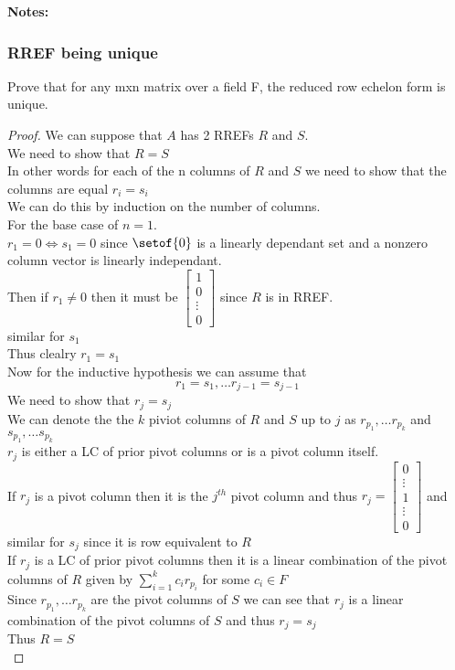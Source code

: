 \documentclass[answers,12pt,addpoints]{exam}
\begin{document}
\textbf{Notes:}\\

\subsubsection{RREF being unique}
Prove that for any mxn matrix over a field F, the reduced row echelon form is unique.\\
\begin{proof}
    We can suppose that $A$ has 2 RREFs $R$ and $S$.\\
    We need to show that $R = S$\\
    In other words for each of the n columns of $R$ and $S$ we need to show that the columns are equal $r_i = s_i$\\
    We can do this by induction on the number of columns.\\
    For the base case of $n=1$. \\
    $r_1 = 0 \iff s_1 = 0$ since $\setof{0}$ is a linearly dependant set and a nonzero column vector is linearly independant.\\
    Then if $r_1 \neq 0$ then it must be $\begin{bmatrix}
        1\\0\\ \vdots \\ 0
    \end{bmatrix}$ since $R$ is in RREF.\\
    similar for $s_1$\\
    Thus clealry $r_1 = s_1$\\
    Now for the inductive hypothesis we can assume that 
    $$r_1 = s_1, \dots r_{j-1} = s_{j-1}$$
    We need to show that $r_j = s_j$\\
    We can denote the the $k$ piviot columns of $R$ and $S$ up to $j$ as $r_{p_1}, \dots r_{p_k}$ and $s_{p_1}, \dots s_{p_k}$\\
    $r_j$ is either a LC of prior pivot columns or is a pivot column itself.\\
    If $r_j$ is a pivot column then it is the $j^{th}$ pivot column and thus $r_j = \begin{bmatrix}
        0 \\ \vdots \\ 1 \\ \vdots \\ 0
    \end{bmatrix}$ and similar for $s_j$ since it is row equivalent to $R$\\
    If $r_j$ is a LC of prior pivot columns then it is a linear combination of the pivot columns of $R$ given by $\sum_{i=1}^{k} c_ir_{p_i}$ for some $c_i \in F$\\
    Since $r_{p_1}, \dots r_{p_k}$ are the pivot columns of $S$ we can see that $r_j$ is a linear combination of the pivot columns of $S$ and thus $r_j = s_j$\\
    Thus $R = S$\\
\end{proof}
\end{document}
